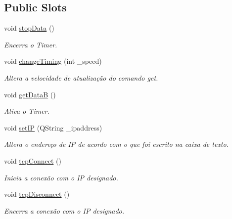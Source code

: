 \subsection*{Public Slots}
\begin{DoxyCompactItemize}
\item 
\mbox{\label{class_plotter_ae42102b524033e1aa33fea567e49e406}} 
void \mbox{\hyperlink{class_plotter_ae42102b524033e1aa33fea567e49e406}{stop\+Data}} ()
\begin{DoxyCompactList}\small\item\em Encerra o Timer. \end{DoxyCompactList}\item 
\mbox{\label{class_plotter_a19710642f034c052eda670f75dd5e5c0}} 
void \mbox{\hyperlink{class_plotter_a19710642f034c052eda670f75dd5e5c0}{change\+Timing}} (int \+\_\+speed)
\begin{DoxyCompactList}\small\item\em Altera a velocidade de atualização do comando \textquotesingle{}get\textquotesingle{}. \end{DoxyCompactList}\item 
\mbox{\label{class_plotter_a353f441c8d35b87f33b18c255757abdc}} 
void \mbox{\hyperlink{class_plotter_a353f441c8d35b87f33b18c255757abdc}{get\+DataB}} ()
\begin{DoxyCompactList}\small\item\em Ativa o Timer. \end{DoxyCompactList}\item 
\mbox{\label{class_plotter_ab3f181cf97ec3e64bb3060fb0916fcfa}} 
void \mbox{\hyperlink{class_plotter_ab3f181cf97ec3e64bb3060fb0916fcfa}{set\+IP}} (Q\+String \+\_\+ipaddress)
\begin{DoxyCompactList}\small\item\em Altera o endereço de IP de acordo com o que foi escrito na caixa de texto. \end{DoxyCompactList}\item 
\mbox{\label{class_plotter_a277dfd9402cf249320f1c9f5c879e152}} 
void \mbox{\hyperlink{class_plotter_a277dfd9402cf249320f1c9f5c879e152}{tcp\+Connect}} ()
\begin{DoxyCompactList}\small\item\em Inicia a conexão com o IP designado. \end{DoxyCompactList}\item 
\mbox{\label{class_plotter_ada7a6cae3ce1cfe9966ee1a2cff891c3}} 
void \mbox{\hyperlink{class_plotter_ada7a6cae3ce1cfe9966ee1a2cff891c3}{tcp\+Disconnect}} ()
\begin{DoxyCompactList}\small\item\em Encerra a conexão com o IP designado. \end{DoxyCompactList}\end{DoxyCompactItemize}
